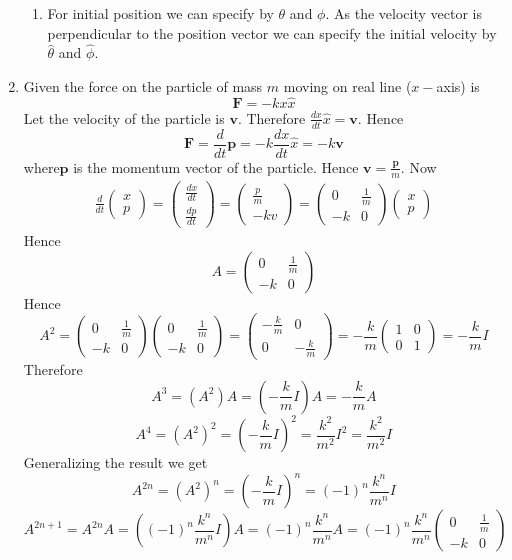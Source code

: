 \documentclass{article}
\newcommand{\bmv}{\boldsymbol{v}}
\newcommand{\bmp}{\boldsymbol{p}}
\newcommand{\bmF}{\boldsymbol{F}}
\begin{document}
\begin{enumerate}
\begin{enumerate}
\item For initial position we can specify by $\theta$ and $\phi$. As the velocity vector is perpendicular to the position vector we can specify the initial velocity by $\hat{\theta}$ and $\hat{\phi}$.
\end{enumerate}
\item Given the force on the particle of mass $m$ moving on real line ($x-$axis) is $$\bmF=-kx\hat{x}$$Let the  velocity of the particle is $\bmv$. Therefore $\frac{dx}{dt}\hat{x}=\bmv$. Hence $$\bmF=\frac{d}{dt}\bmp=-k\frac{dx}{dt}\hat{x}=-k\bmv$$where$\bmp$ is the momentum vector of the particle. Hence $\bmv=\frac{\bmp}{m}$. Now\begin{align*}
	\frac{d}{dt}\begin{pmatrix}
		x\\
		p
	\end{pmatrix}=\begin{pmatrix}
	\frac{dx}{dt}\\
	\frac{dp}{dt}
\end{pmatrix}=\begin{pmatrix}
\frac{p}{m}\\
-kv
\end{pmatrix}=\begin{pmatrix}
0&\frac{1}{m}\\
-k&0
\end{pmatrix}\begin{pmatrix}
x\\
p
\end{pmatrix}
\end{align*}Hence $$A=\begin{pmatrix}
0&\frac1m\\
-k&0
\end{pmatrix}$$Hence $$A^2=\begin{pmatrix}
0&\frac1m\\
-k&0
\end{pmatrix}\begin{pmatrix}
0&\frac1m\\
-k&0
\end{pmatrix}=\begin{pmatrix}
-\frac{k}{m}&0\\
0&-\frac{k}{m}
\end{pmatrix}=-\frac{k}{m}\begin{pmatrix}
1&0\\
0&1
\end{pmatrix}=-\frac{k}{m}I$$Therefore$$A^3=(A^2)A=\left( -\frac{k}{m}I\right) A=-\frac{k}{m}A$$ $$A^4=(A^2)^2=\left( -\frac{k}{m}I\right) ^2=\frac{k^2}{m^2}I^2=\frac{k^2}{m^2}I$$Generalizing the result we get$$A^{2n}=(A^2)^n=\left( -\frac{k}{m}I\right)^n=(-1)^n\frac{k^n}{m^n}I$$
$$A^{2n+1}=A^{2n}A=\left((-1)^n\frac{k^n}{m^n}I \right) A=(-1)^n\frac{k^n}{m^n}A=(-1)^n\frac{k^n}{m^n}\begin{pmatrix}
	0&\frac1m\\
	-k&0
\end{pmatrix}$$
	\end{enumerate}
\end{document}
